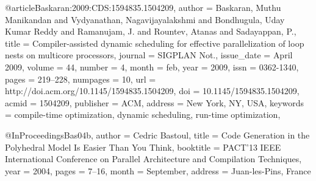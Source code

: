 @article{Baskaran:2009:CDS:1594835.1504209,
 author = {Baskaran, Muthu Manikandan and Vydyanathan, Nagavijayalakshmi and Bondhugula, Uday Kumar Reddy and Ramanujam, J. and Rountev, Atanas and Sadayappan, P.},
 title = {Compiler-assisted dynamic scheduling for effective parallelization of loop nests on multicore processors},
 journal = {SIGPLAN Not.},
 issue_date = {April 2009},
 volume = {44},
 number = {4},
 month = feb,
 year = {2009},
 issn = {0362-1340},
 pages = {219--228},
 numpages = {10},
 url = {http://doi.acm.org/10.1145/1594835.1504209},
 doi = {10.1145/1594835.1504209},
 acmid = {1504209},
 publisher = {ACM},
 address = {New York, NY, USA},
 keywords = {compile-time optimization, dynamic scheduling, run-time optimization},
}

@InProceedings{Bas04b,
 author = {Cedric Bastoul},
 title = {Code Generation in the Polyhedral Model Is Easier Than You Think},
 booktitle = {PACT'13 IEEE International Conference on Parallel Architecture
              and Compilation Techniques},
 year =	2004,
 pages = {7--16},
 month = {September},
 address = {Juan-les-Pins, France}
}
